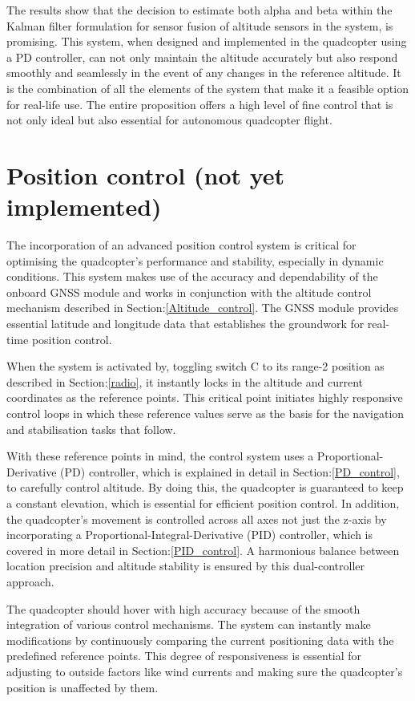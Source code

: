 \documentclass{report}
\begin{document}
The results show that the decision to estimate both alpha and beta within the
Kalman filter formulation for sensor fusion of altitude sensors in the system,
is promising. This system, when designed and implemented in the quadcopter using
a PD controller, can not only maintain the altitude accurately but also respond
smoothly and seamlessly in the event of any changes in the reference altitude.
It is the combination of all the elements of the system that make it a feasible
option for real-life use. The entire proposition offers a high level of fine
control that is not only ideal but also essential for autonomous quadcopter
flight.

\section{Position control (not yet implemented)}
The incorporation of an advanced position control system is critical for
optimising the quadcopter's performance and stability, especially in dynamic
conditions. This system makes use of the accuracy and dependability of the
onboard GNSS module and works in conjunction with the altitude control mechanism
described in Section:\ref{Altitude_control}. The GNSS module provides essential
latitude and longitude data that establishes the groundwork for real-time
position control.

When the system is activated by, toggling switch C to its range-2 position as
described in Section:\ref{radio}, it instantly locks in the altitude and current
coordinates as the reference points. This critical point initiates highly
responsive control loops in which these reference values serve as the basis for
the navigation and stabilisation tasks that follow.

With these reference points in mind, the control system uses a
Proportional-Derivative (PD) controller, which is explained in detail in
Section:\ref{PD_control}, to carefully control altitude. By doing this, the
quadcopter is guaranteed to keep a constant elevation, which is essential for
efficient position control. In addition, the quadcopter's movement is controlled
across all axes not just the z-axis by incorporating a
Proportional-Integral-Derivative (PID) controller, which is covered in more
detail in Section:\ref{PID_control}. A harmonious balance between location
precision and altitude stability is ensured by this dual-controller approach. 

The quadcopter should hover with high accuracy because of the smooth integration
of various control mechanisms. The system can instantly make modifications by
continuously comparing the current positioning data with the predefined
reference points. This degree of responsiveness is essential for adjusting to
outside factors like wind currents and making sure the quadcopter's position is
unaffected by them.
\end{document}
